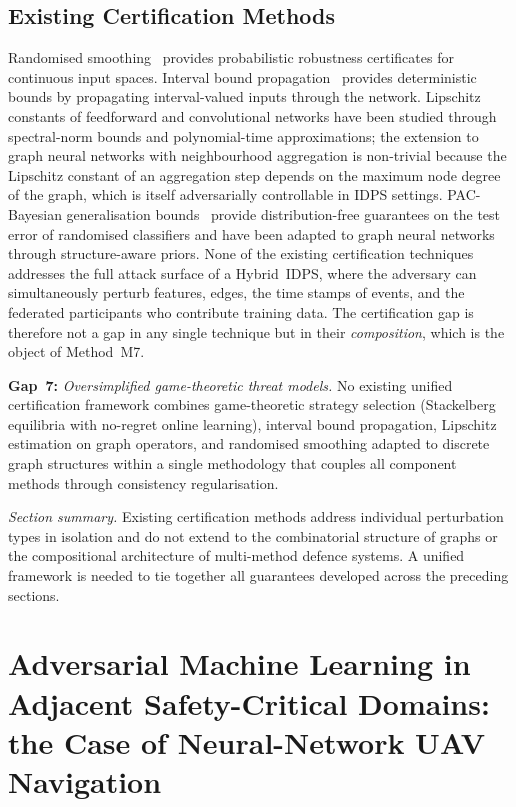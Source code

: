 \subsection{Existing Certification Methods}

Randomised smoothing~\cite{Cohen2019,Salman2019} provides probabilistic robustness certificates for continuous input spaces. Interval bound propagation~\cite{Gowal2019,Wong2018} provides deterministic bounds by propagating interval-valued inputs through the network. Lipschitz constants of feedforward and convolutional networks have been studied through spectral-norm bounds and polynomial-time approximations; the extension to graph neural networks with neighbourhood aggregation is non-trivial because the Lipschitz constant of an aggregation step depends on the maximum node degree of the graph, which is itself adversarially controllable in IDPS settings. PAC-Bayesian generalisation bounds~\cite{McAllester1999,Dziugaite2017} provide distribution-free guarantees on the test error of randomised classifiers and have been adapted to graph neural networks through structure-aware priors. None of the existing certification techniques addresses the full attack surface of a Hybrid~IDPS, where the adversary can simultaneously perturb features, edges, the time stamps of events, and the federated participants who contribute training data. The certification gap is therefore not a gap in any single technique but in their \emph{composition}, which is the object of Method~M7.

\noindent\textbf{Gap~7:} \emph{Oversimplified game-theoretic threat models.} No existing unified certification framework combines game-theoretic strategy selection (Stackelberg equilibria with no-regret online learning), interval bound propagation, Lipschitz estimation on graph operators, and randomised smoothing adapted to discrete graph structures within a single methodology that couples all component methods through consistency regularisation.

\medskip
\noindent\textit{Section summary.} Existing certification methods address individual perturbation types in isolation and do not extend to the combinatorial structure of graphs or the compositional architecture of multi-method defence systems. A unified framework is needed to tie together all guarantees developed across the preceding sections.

\section{Adversarial Machine Learning in Adjacent Safety-Critical Domains: the Case of Neural-Network UAV Navigation}
\label{sec:ch1_uav_related}

